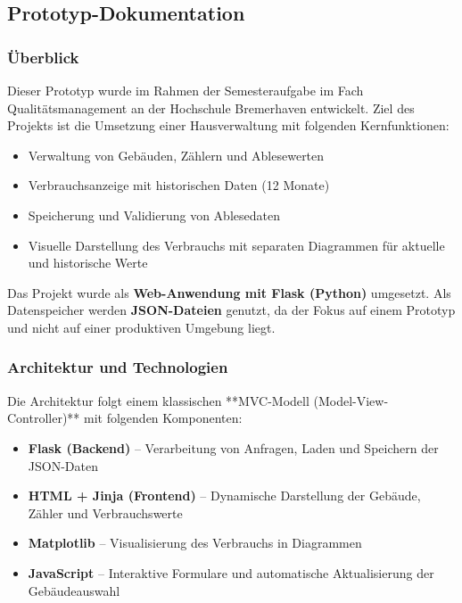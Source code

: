 \subsection{Prototyp-Dokumentation}

\subsubsection{Überblick}

Dieser Prototyp wurde im Rahmen der Semesteraufgabe im Fach Qualitätsmanagement an der Hochschule Bremerhaven entwickelt. Ziel des Projekts ist die Umsetzung einer Hausverwaltung mit folgenden Kernfunktionen:

\begin{itemize}
    \item Verwaltung von Gebäuden, Zählern und Ablesewerten
    \item Verbrauchsanzeige mit historischen Daten (12 Monate)
    \item Speicherung und Validierung von Ablesedaten
    \item Visuelle Darstellung des Verbrauchs mit separaten Diagrammen für aktuelle und historische Werte
\end{itemize}

Das Projekt wurde als \textbf{Web-Anwendung mit Flask (Python)} umgesetzt. Als Datenspeicher werden \textbf{JSON-Dateien} genutzt, da der Fokus auf einem Prototyp und nicht auf einer produktiven Umgebung liegt.

\subsubsection{Architektur und Technologien}

Die Architektur folgt einem klassischen **MVC-Modell (Model-View-Controller)** mit folgenden Komponenten:

\begin{itemize}
    \item \textbf{Flask (Backend)} – Verarbeitung von Anfragen, Laden und Speichern der JSON-Daten
    \item \textbf{HTML + Jinja (Frontend)} – Dynamische Darstellung der Gebäude, Zähler und Verbrauchswerte
    \item \textbf{Matplotlib} – Visualisierung des Verbrauchs in Diagrammen
    \item \textbf{JavaScript} – Interaktive Formulare und automatische Aktualisierung der Gebäudeauswahl
\end{itemize}

